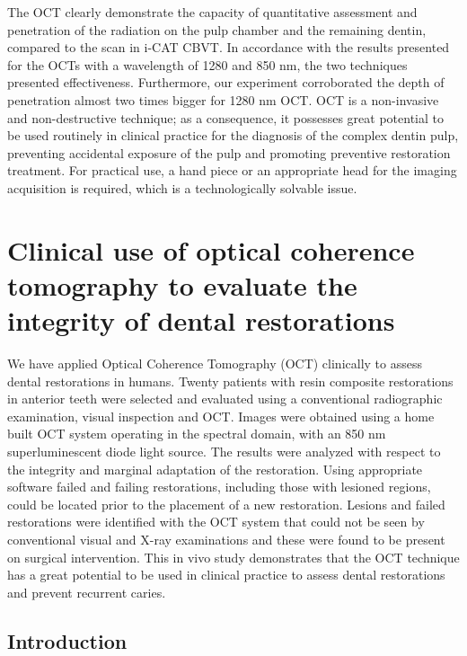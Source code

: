 \documentclass[12pt,twoside,english]{book}
\renewcommand{\~}{\perispomeni}%
\numberwithin{equation}{section}
\numberwithin{figure}{section}
\begin{document}
The OCT clearly demonstrate the capacity of quantitative assessment and penetration of the radiation on the pulp chamber and the remaining dentin, compared to the scan in i-CAT CBVT. In accordance with the results presented for the OCTs with a wavelength of 1280 and 850 nm, the two techniques presented effectiveness. Furthermore, our experiment corroborated the depth of penetration almost two times bigger for 1280 nm OCT. OCT is a non-invasive and non-destructive technique; as a consequence, it possesses great potential to be used routinely in clinical practice for the diagnosis of the complex dentin pulp, preventing accidental exposure of the pulp and promoting preventive restoration treatment. For practical use, a hand piece or an appropriate head for the imaging acquisition is required, which is a technologically solvable issue.

\section[Clinical use of OCT to evaluate integrity of dental restorations]{Clinical use of optical coherence tomography to evaluate the integrity of dental restorations}

We have applied Optical Coherence Tomography (OCT) clinically to assess dental restorations in humans. Twenty patients with resin composite restorations in anterior teeth were selected and evaluated using a conventional radiographic examination, visual inspection and OCT. Images were obtained using a home built OCT system operating in the spectral domain, with an 850 nm superluminescent diode light source. The results were analyzed with respect to the integrity and marginal adaptation of the restoration. Using appropriate software failed and failing restorations, including those with lesioned regions, could be located prior to the placement of a new restoration. Lesions and failed restorations were identified with the OCT system that could not be seen by conventional visual and X-ray examinations and these were found to be present on surgical intervention. This in vivo study demonstrates that the OCT technique has a great potential to be used in clinical practice to assess dental restorations and prevent recurrent caries. 

\subsection{Introduction}

\end{document}
